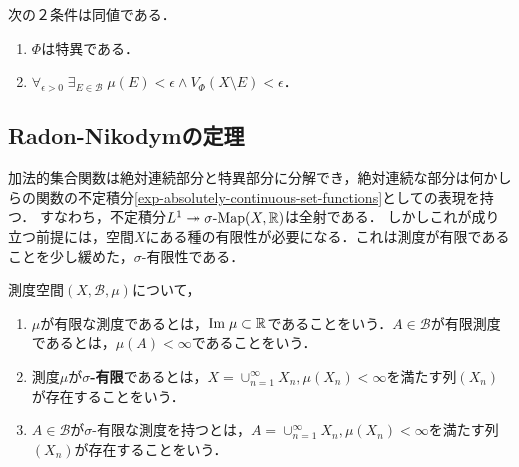 \documentclass[uplatex, dvipdfmx]{jsreport}
\renewcommand{\B}{\mathcal{B}}
\begin{document}
\begin{theorem}
    次の２条件は同値である．
    \begin{enumerate}
        \item $\Phi$は特異である．
        \item $\forall_{\epsilon>0}\;\exists_{E\in\B}\;\mu(E)<\epsilon\land V_\Phi(X\setminus E)<\epsilon$．
    \end{enumerate}
\end{theorem}

\subsection{Radon-Nikodymの定理}

\begin{tcolorbox}[colframe=ForestGreen, colback=ForestGreen!10!white,breakable,colbacktitle=ForestGreen!40!white,coltitle=black,fonttitle=\bfseries\sffamily,
title=]
    加法的集合関数は絶対連続部分と特異部分に分解でき，絶対連続な部分は何かしらの関数の不定積分\ref{exp-absolutely-continuous-set-functions}としての表現を持つ．
    すなわち，不定積分$L^1\twoheadrightarrow\sigma\textrm{-}\mathrm{Map}(X,\mathbb{R})$は全射である．
    しかしこれが成り立つ前提には，空間$X$にある種の有限性が必要になる．これは測度が有限であることを少し緩めた，$\sigma$-有限性である．
\end{tcolorbox}

\begin{definition}
    測度空間$(X,\B,\mu)$について，
    \begin{enumerate}
        \item $\mu$が有限な測度であるとは，$\mathrm{Im}\;\mu\subset\mathbb{R}$であることをいう．$A\in\B$が有限測度であるとは，$\mu(A)<\infty$であることをいう．
        \item 測度$\mu$が\textbf{$\sigma$-有限}であるとは，$X=\cup^\infty_{n=1}X_n,\mu(X_n)<\infty$を満たす列$(X_n)$が存在することをいう．
        \item $A\in\B$が$\sigma$-有限な測度を持つとは，$A=\cup^\infty_{n=1}X_n,\mu(X_n)<\infty$を満たす列$(X_n)$が存在することをいう．
    \end{enumerate}
\end{definition}
\end{document}
